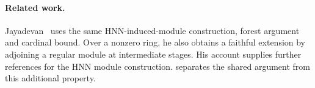 
\paragraph{Related work.}
Jayadevan~\cite{jayadevan-17-101} uses the same HNN-induced-module
construction, forest argument and cardinal bound. Over a nonzero ring,
he also obtains a faithful extension by adjoining a regular module at
intermediate stages. His account supplies further references for the
HNN module construction. \Comparisonlocation{}
separates the shared argument from this additional property.

